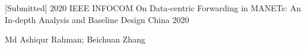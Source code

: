 

\begin{cventries}

  \cventry
    {[Submitted] 2020 IEEE INFOCOM} %
    {On Data-centric Forwarding in MANETs: An In-depth Analysis and Baseline Design} %
    {China} %
    {2020} %
    {
      \begin{cvitems} %
        \item {Md Ashiqur Rahman; Beichuan Zhang}
      \end{cvitems}
    }
    {}

\end{cventries}
